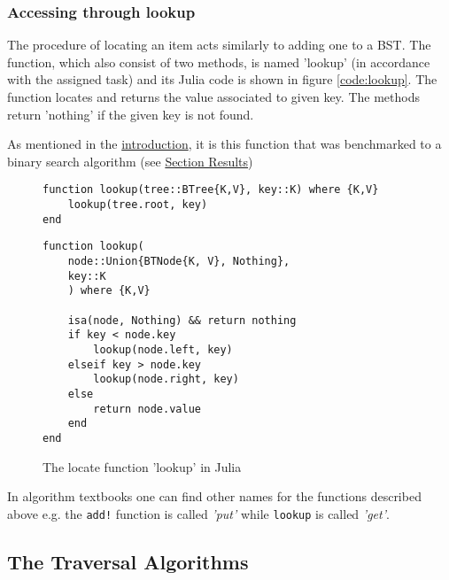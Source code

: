 \documentclass[a4paper, 11pt]{article}
\begin{document}
    \subsubsection*{Accessing through lookup}
    \label{sec:lookup}
    The procedure of locating an item acts similarly to adding one to
    a BST. 
    The function, which also consist of two methods, is named 'lookup' (in
    accordance with the assigned task) and its Julia code is shown in figure
    \autoref{code:lookup}. The function locates and returns the value associated
    to given key. The methods return 'nothing' if the given key is not found. 
    
    As mentioned in the \hyperref[sec:introduction]{introduction}, 
    it is this function that was benchmarked to 
    a binary search algorithm (see \hyperref[sec:results]{Section Results})

    \begin{figure}[H]
        \centering
    \begin{verbatim}
function lookup(tree::BTree{K,V}, key::K) where {K,V} 
    lookup(tree.root, key)
end
    \end{verbatim}
    \begin{verbatim}
function lookup(
    node::Union{BTNode{K, V}, Nothing}, 
    key::K
    ) where {K,V}
    
    isa(node, Nothing) && return nothing
    if key < node.key
        lookup(node.left, key)
    elseif key > node.key
        lookup(node.right, key)
    else
        return node.value
    end
end
    \end{verbatim}
    \caption{The locate function 'lookup' in Julia}
    \label{code:lookup}
    \end{figure}
    In algorithm textbooks one can find other names for the functions described above 
    e.g. the \texttt{add!} function is called \emph{'put'} while 
    \texttt{lookup} is called \emph{'get'}.


    \subsection*{The Traversal Algorithms}
    \label{sec:treetraversal}
    
\end{document}

